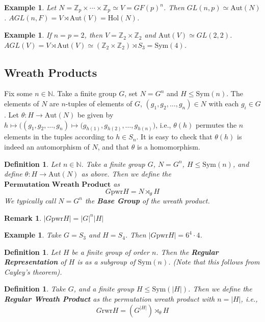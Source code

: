 \documentclass[a4paper,10pt]{article}
\newcommand{\NN}{\mathbb{N}}
\newcommand{\ZZ}{\mathbb{Z}}
\newtheorem{Def}[thm]{Definition}
\newtheorem{eg}[thm]{Example}
\newtheorem{rem}[thm]{Remark}
\begin{document}
\begin{eg}
Let $N = \ZZ_p \times \cdots \times \ZZ_p \simeq V = GF(p)^n$. Then $GL(n,p) \simeq \text{Aut}(N)$. $AGL(n,F) = V \rtimes \text{Aut}(V) = \text{Hol}(N)$.
\end{eg}

\begin{eg}
If $n = p = 2$, then $V = \ZZ_2 \times \ZZ_2$ and $\text{Aut}(V) \simeq GL(2,2)$. $AGL(V) = V \rtimes \text{Aut}(V) \simeq (\ZZ_2 \times \ZZ_2) \rtimes S_3 = \text{Sym}(4)$. 
\end{eg}

\subsection{Wreath Products}
Fix some $n \in \NN$. Take a finite group $G$, set $N = G^n$ and $H \leq \text{Sym}(n)$. The elements of $N$ are $n$-tuples of elements of $G$, $(g_1, g_2, \dots, g_n) \in N$ with each $g_i \in G$. Let $\theta: H \rightarrow \text{Aut}(N)$ be given by $h \mapsto \big( (g_1, g_2, \dots, g_n) \mapsto (g_{h(1)}, g_{h(2)}, \dots, g_{h(n)} \big)$, i.e., $\theta(h)$ permutes the $n$ elements in the tuples according to $h \in S_n$. It is easy to check that $\theta(h)$ is indeed an automorphism of $N$, and that $\theta$ is a homomorphism.

\begin{Def}
Let $n \in \NN$. Take a finite group $G$, $N = G^n$, $H \leq \text{Sym}(n)$, and define $\theta: H \rightarrow \text{Aut}(N)$ as above. Then we define the $\textbf{Permutation Wreath Product}$ as
\[ G \text{pwr} H = N \rtimes_\theta H \]
We typically call $N = G^n$ the \textbf{Base Group} of the wreath product.
\end{Def}


\begin{rem}
$|G \text{pwr} H| = |G|^n |H|$
\end{rem}


\begin{eg}
Take $G = S_3$ and $H = S_4$. Then $|G \text{pwr} H| = 6^4 \cdot 4$. 
\end{eg}


\begin{Def}
Let $H$ be a finite group of order $n$. Then the \textbf{Regular Representation} of $H$ is as a subgroup of $\text{Sym}(n)$. (Note that this follows from Cayley's theorem).
\end{Def}


\begin{Def}
Take $G$, and a finite group $H \leq \text{Sym}(|H|)$. Then we define the \textbf{Regular Wreath Product} as the permutation wreath product with $n = |H|$, i.e., 
\[ G \text{rwr} H = ( G^{|H|}) \rtimes_\theta H \]
\end{Def}
\end{document}

